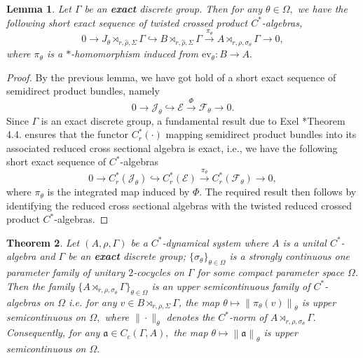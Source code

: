 \documentclass[a4paper,11pt,reqno]{amsart}
\theoremstyle{plain}
\newtheorem{thm}{Theorem}[section]
\newtheorem{lem}[thm]{Lemma}
\theoremstyle{mainthmstyle}
\theoremstyle{named}
\numberwithin{equation}{section}
\begin{document}
\begin{lem} \label{Fell_Exactness}
Let $\Gamma$ be an {\bf exact} discrete group. Then for any $\theta \in \Omega,$ we have the following short exact sequence of twisted crossed product $C^{\ast}$-algebras, 
$$ 0 \rightarrow J_{\theta} \rtimes_{r, \hat{\rho}, \Sigma} \Gamma \hookrightarrow B \rtimes_{r, \hat{\rho}, \Sigma} \Gamma \xrightarrow{\pi_{\theta}} A \rtimes_{r, \rho, \sigma_{\theta}} \Gamma \rightarrow 0,$$
where $\pi_{\theta}$ is a $\ast$-homomorphism induced from $\mathrm {ev}_{\theta} : B \rightarrow A.$
\end{lem}

\begin{proof}
By the previous lemma, we have got hold of a short exact sequence of semidirect product bundles, namely
$$0 \rightarrow \mathcal J_{\theta} \hookrightarrow \mathcal E \xrightarrow {\Phi} \mathcal F_{\theta} \rightarrow 0.$$
Since $\Gamma$ is an exact discrete group, a fundamental result due to Exel \cite{Exel-Exact}*{Theorem 4.4.} ensures that the functor $C_r^{\ast} (\cdot)$ mapping semidirect product bundles into its associated reduced cross sectional algebra is exact, i.e., we have the following short exact sequence of $C^{\ast}$-algebras
$$0 \rightarrow C_r^{\ast}(\mathcal{J}_{\theta}) \hookrightarrow C_r^{\ast}(\mathcal{E}) \xrightarrow{\pi_{\theta}} C_r^{\ast}(\mathcal{F}_{\theta}) \rightarrow 0,$$
where $\pi_{\theta}$ is the integrated map induced by $\Phi.$ The required result then follows by identifying the reduced cross sectional algebras with the twisted reduced crossed product $C^{\ast}$-algebras.
\end{proof}

\begin{thm} \label{upper semicontinuity}
Let $(A,\rho,\Gamma)$ be a $C^{\ast}$-dynamical system where $A$ is a unital $C^{\ast}$-algebra and $\Gamma$ be an {\bf exact} discrete group; $\{\sigma_{\theta}\}_{\theta\in\Omega}$ is a strongly continuous one parameter family of unitary $2$-cocycles on $\Gamma$ for some compact parameter space $\Omega$. Then the family $\{A \rtimes_{r, \rho, \sigma_\theta} \Gamma\}_{\theta\in\Omega}$ is an upper semicontinuous family of $C^{\ast}$-algebras on $\Omega$ i.e. for any $v\in B \rtimes_{r, \rho, \Sigma} \Gamma$, the map $\theta\mapsto \left \| \pi_{\theta} (v) \right \|_{\theta}$ is upper semicontinuous on $\Omega,$ where $\| \cdot \|_{\theta}$ denotes the $C^{\ast}$-norm of $A \rtimes_{r, \rho, \sigma_\theta} \Gamma.$ Consequently, for any $\mathfrak{a} \in C_c (\Gamma, A),$ the map $\theta \mapsto \left \|\mathfrak{a} \right \|_{\theta}$ is upper semicontinuous on $\Omega.$
\end{thm}
\end{document}
